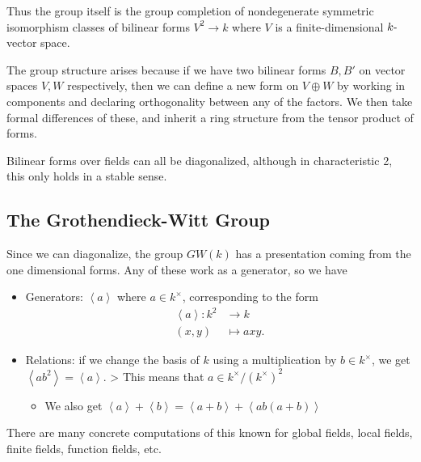Thus the group itself is the group completion of nondegenerate symmetric
isomorphism classes of bilinear forms \(V^2 \to k\) where \(V\) is a
finite-dimensional \(k{\hbox{-}}\)vector space.

The group structure arises because if we have two bilinear forms
\(B, B'\) on vector spaces \(V, W\) respectively, then we can define a
new form on \(V \oplus W\) by working in components and declaring
orthogonality between any of the factors. We then take formal
differences of these, and inherit a ring structure from the tensor
product of forms.

Bilinear forms over fields can all be diagonalized, although in
characteristic 2, this only holds in a stable sense.

\hypertarget{the-grothendieck-witt-group}{%
\subsection{The Grothendieck-Witt
Group}\label{the-grothendieck-witt-group}}

Since we can diagonalize, the group \(GW(k)\) has a presentation coming
from the one dimensional forms. Any of these work as a generator, so we
have

\begin{itemize}
\item
  Generators: \(\left\langle{a}\right\rangle\) where \(a\in k^\times\),
  corresponding to the form
  \begin{align*}     \left\langle{a}\right\rangle : k^2 &\to k\\     (x,y) &\mapsto axy     .\end{align*}
\item
  Relations: if we change the basis of \(k\) using a multiplication by
  \(b\in k^\times\), we get
  \(\left\langle{ab^2}\right\rangle = \left\langle{a}\right\rangle\).
  \textgreater{} This means that \(a \in k^\times/(k^\times)^2\)

  \begin{itemize}
  \tightlist
  \item
    We also get
    \(\left\langle{a}\right\rangle + \left\langle{b}\right\rangle = \left\langle{a+b}\right\rangle + \left\langle{ab(a+b)}\right\rangle\)
  \end{itemize}
\end{itemize}

There are many concrete computations of this known for global fields,
local fields, finite fields, function fields, etc.

